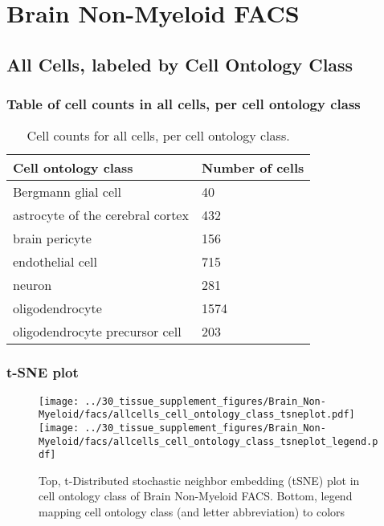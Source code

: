 \newpage
\section{Brain Non-Myeloid FACS}

\subsection{All Cells, labeled by Cell Ontology Class}
\subsubsection{Table of cell counts in all cells, per cell ontology class}\begin{table}[h]
\centering
\label{my-label}
\begin{tabular}{@{}ll@{}}
\toprule

Cell ontology class& Number of cells \\ \midrule
Bergmann glial cell & 40 \\

astrocyte of the cerebral cortex & 432 \\

brain pericyte & 156 \\

endothelial cell & 715 \\

neuron & 281 \\

oligodendrocyte & 1574 \\

oligodendrocyte precursor cell & 203 \\
\bottomrule
\end{tabular}
\caption{Cell counts for all cells, per cell ontology class.}
\end{table}

\newpage
\subsubsection{t-SNE plot}
\begin{figure}[h]
\centering
\texttt{[image: ../30\_tissue\_supplement\_figures/Brain\_Non-Myeloid/facs/allcells\_cell\_ontology\_class\_tsneplot.pdf]}
\texttt{[image: ../30\_tissue\_supplement\_figures/Brain\_Non-Myeloid/facs/allcells\_cell\_ontology\_class\_tsneplot\_legend.pdf]}
\caption{Top, t-Distributed stochastic neighbor embedding (tSNE) plot  in cell ontology class of Brain Non-Myeloid FACS. Bottom, legend mapping cell ontology class (and letter abbreviation) to colors}
\end{figure}



